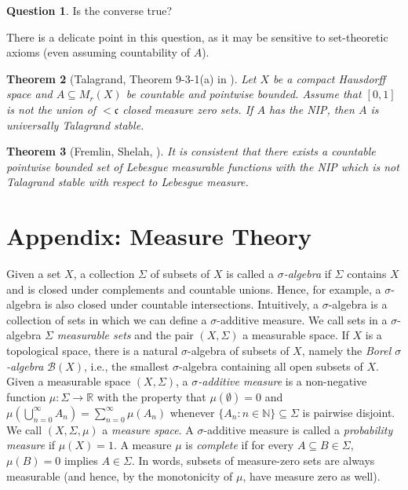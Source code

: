\documentclass[psamsfonts]{amsart}
\newtheorem{thm}{Theorem}[section]
\theoremstyle{definition}
\newtheorem{question}[thm]{Question}
\theoremstyle{remark}
\numberwithin{equation}{section}
\begin{document}
\begin{question}
    Is the converse true?
\end{question}

There is a delicate point in this question, as it may be sensitive to set-theoretic axioms (even assuming countability of $A$).

\begin{thm}[Talagrand, Theorem 9-3-1(a) in \cite{talagrand1984pettis}]
    Let $X$ be a compact Hausdorff space and $A\subseteq M_r(X)$ be countable and pointwise bounded. Assume that $[0,1]$ is not the union of $<\mathfrak{c}$ closed measure zero sets. If $A$ has the NIP, then $A$ is universally Talagrand stable.
\end{thm}

\begin{thm}[Fremlin, Shelah, \cite{fremlin1993pointwise}]
    It is consistent that there exists a countable pointwise bounded set of Lebesgue measurable functions with the NIP which is not Talagrand stable with respect to Lebesgue measure.
\end{thm}

\section*{Appendix: Measure Theory}

Given a set $X$, a collection $\Sigma$ of subsets of $X$ is called a \emph{$\sigma$-algebra} if $\Sigma$ contains $X$ and is closed under complements and countable unions. Hence, for example, a $\sigma$-algebra is also closed under countable intersections. Intuitively, a $\sigma$-algebra is a collection of sets in which we can define a $\sigma$-additive measure. We call sets in a $\sigma$-algebra $\Sigma$ \emph{measurable sets} and the pair $(X,\Sigma)$ a measurable space. If $X$ is a topological space, there is a natural $\sigma$-algebra of subsets of $X$, namely the \emph{Borel $\sigma$-algebra} $\mathcal{B}(X)$, i.e., the smallest $\sigma$-algebra containing all open subsets of $X$. Given a measurable space $(X,\Sigma)$, a \emph{$\sigma$-additive measure} is a non-negative function $\mu:\Sigma\rightarrow\mathbb{R}$ with the property that $\mu(\emptyset)=0$ and $\mu(\bigcup_{n=0}^\infty A_n)=\sum_{n=0}^\infty\mu(A_n)$ whenever $\{A_n:n\in\mathbb{N}\}\subseteq\Sigma$ is pairwise disjoint. We call $(X,\Sigma,\mu)$ a \emph{measure space}. A $\sigma$-additive measure is called a \emph{probability measure} if $\mu(X)=1$. A measure $\mu$ is \emph{complete} if for every $A\subseteq B\in\Sigma$, $\mu(B)=0$ implies $A\in\Sigma$. In words, subsets of measure-zero sets are always measurable (and hence, by the monotonicity of $\mu$, have measure zero as well).
\end{document}
